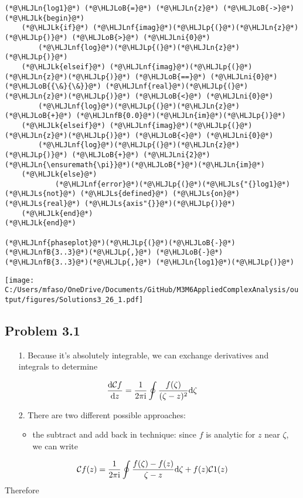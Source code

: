 \documentclass[12pt,a4paper]{article}
\newcommand{\HLJLk}[1]{\textcolor[RGB]{148,91,176}{\textbf{#1}}}
\newcommand{\HLJLn}[1]{#1}
\newcommand{\HLJLnf}[1]{\textcolor[RGB]{66,102,213}{#1}}
\newcommand{\HLJLs}[1]{\textcolor[RGB]{201,61,57}{#1}}
\newcommand{\HLJLnfB}[1]{\textcolor[RGB]{59,151,46}{#1}}
\newcommand{\HLJLni}[1]{\textcolor[RGB]{59,151,46}{#1}}
\newcommand{\HLJLoB}[1]{\textcolor[RGB]{102,102,102}{\textbf{#1}}}
\newcommand{\HLJLp}[1]{#1}
\def\D{ {\rm d} }
\def\I{ {\rm i} }
\def\CC{ {\cal C} }
\begin{document}
\begin{lstlisting}
(*@\HLJLn{log1}@*) (*@\HLJLoB{=}@*) (*@\HLJLn{z}@*) (*@\HLJLoB{->}@*) (*@\HLJLk{begin}@*)
    (*@\HLJLk{if}@*) (*@\HLJLnf{imag}@*)(*@\HLJLp{(}@*)(*@\HLJLn{z}@*)(*@\HLJLp{)}@*) (*@\HLJLoB{>}@*) (*@\HLJLni{0}@*)
        (*@\HLJLnf{log}@*)(*@\HLJLp{(}@*)(*@\HLJLn{z}@*)(*@\HLJLp{)}@*)
    (*@\HLJLk{elseif}@*) (*@\HLJLnf{imag}@*)(*@\HLJLp{(}@*)(*@\HLJLn{z}@*)(*@\HLJLp{)}@*) (*@\HLJLoB{==}@*) (*@\HLJLni{0}@*) (*@\HLJLoB{{\&}{\&}}@*) (*@\HLJLnf{real}@*)(*@\HLJLp{(}@*)(*@\HLJLn{z}@*)(*@\HLJLp{)}@*) (*@\HLJLoB{<}@*) (*@\HLJLni{0}@*)
        (*@\HLJLnf{log}@*)(*@\HLJLp{(}@*)(*@\HLJLn{z}@*) (*@\HLJLoB{+}@*) (*@\HLJLnfB{0.0}@*)(*@\HLJLn{im}@*)(*@\HLJLp{)}@*)
    (*@\HLJLk{elseif}@*) (*@\HLJLnf{imag}@*)(*@\HLJLp{(}@*)(*@\HLJLn{z}@*)(*@\HLJLp{)}@*) (*@\HLJLoB{<}@*) (*@\HLJLni{0}@*)
        (*@\HLJLnf{log}@*)(*@\HLJLp{(}@*)(*@\HLJLn{z}@*)(*@\HLJLp{)}@*) (*@\HLJLoB{+}@*) (*@\HLJLni{2}@*)(*@\HLJLn{\ensuremath{\pi}}@*)(*@\HLJLoB{*}@*)(*@\HLJLn{im}@*)
    (*@\HLJLk{else}@*)
            (*@\HLJLnf{error}@*)(*@\HLJLp{(}@*)(*@\HLJLs{"{}log1}@*) (*@\HLJLs{not}@*) (*@\HLJLs{defined}@*) (*@\HLJLs{on}@*) (*@\HLJLs{real}@*) (*@\HLJLs{axis"{}}@*)(*@\HLJLp{)}@*)
    (*@\HLJLk{end}@*)
(*@\HLJLk{end}@*)

(*@\HLJLnf{phaseplot}@*)(*@\HLJLp{(}@*)(*@\HLJLoB{-}@*)(*@\HLJLnfB{3..3}@*)(*@\HLJLp{,}@*) (*@\HLJLoB{-}@*)(*@\HLJLnfB{3..3}@*)(*@\HLJLp{,}@*) (*@\HLJLn{log1}@*)(*@\HLJLp{)}@*)
\end{lstlisting}

\texttt{[image: C:/Users/mfaso/OneDrive/Documents/GitHub/M3M6AppliedComplexAnalysis/output/figures/Solutions3\_26\_1.pdf]}

\subsection{Problem 3.1}
\begin{itemize}
\item[1. ] Because it's absolutely integrable, we can exchange derivatives and integrals to determine

\end{itemize}
\[
{\D \CC f \over \D z} = {1 \over 2 \pi \I} \oint {f(\zeta)\over (\zeta-z)^2} \D \zeta
\]
\begin{itemize}
\item[2. ] There are two different possible approaches:

\begin{itemize}
\item the subtract and add back in technique: since $f$ is analytic for $z$ near $\zeta$, we can write

\end{itemize}
\end{itemize}
\[
\CC f(z) = {1 \over 2 \pi \I} \oint {f(\zeta)-f(z) \over \zeta-z} \D \zeta + f(z) \CC 1(z)
\]
Therefore
\end{document}
